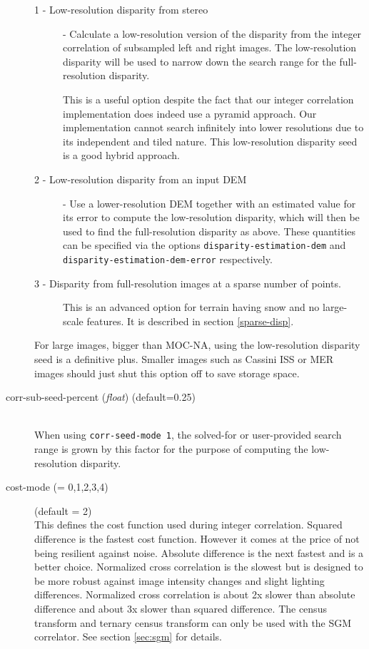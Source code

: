 \begin{description}
\begin{description}
  \item[1 - Low-resolution disparity from stereo] - Calculate a
    low-resolution version of the disparity from the integer correlation
    of subsampled left and right images.  The low-resolution disparity
    will be used to narrow down the search range for the full-resolution
    disparity.

    This is a useful option despite the fact that our integer
    correlation implementation does indeed use a pyramid approach. Our
    implementation cannot search infinitely into lower resolutions due
    to its independent and tiled nature. This low-resolution disparity
    seed is a good hybrid approach.

  \item[2 - Low-resolution disparity from an input DEM] - Use a
    lower-resolution DEM together with an estimated value for its error
    to compute the low-resolution disparity, which will then be used to
    find the full-resolution disparity as above. These quantities can be
    specified via the options \texttt{disparity-estimation-dem} and
    \texttt{disparity-estimation-dem-error} respectively.

  \item[3 - Disparity from full-resolution images at a sparse number of
    points.] This is an advanced option for terrain having snow and no
    large-scale features. It is described in section \ref{sparse-disp}.

  \end{description}

  For large images, bigger than MOC-NA, using the low-resolution
  disparity seed is a definitive plus. Smaller images such as Cassini
  ISS or MER images should just shut this option off to save storage
  space.

\item[corr-sub-seed-percent \textnormal{\small{(\emph{float})}} (default=0.25)] \hfill \\
  When using \texttt{corr-seed-mode 1}, the solved-for or user-provided
  search range is grown by this factor for the purpose of computing the
  low-resolution disparity.

\item[cost-mode \textnormal{\small{(= 0,1,2,3,4)}}] (default = 2) \hfill \\

  This defines the cost function used during integer
  correlation. Squared difference is the fastest cost
  function. However it comes at the price of not being resilient
  against noise. Absolute difference is the next fastest and is a
  better choice. Normalized cross correlation is the slowest but is
  designed to be more robust against image intensity changes and
  slight lighting differences. Normalized cross correlation is about
  2x slower than absolute difference and about 3x slower than squared
  difference.  The census transform \citep{zabih1994census} and
  ternary census transform \citep{hua2016texture} can only be used with the 
  SGM correlator.  See section \ref{sec:sgm} for details.


\end{description}
